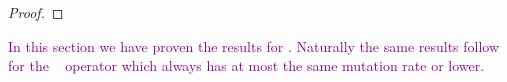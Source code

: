 \documentclass[lettersize,journal]{IEEEtran}
\begin{document}
\begin{proof}
	
\end{proof}

\textcolor{purple}{In this section we have proven the results for \linHD. Naturally the same results follow for the \expoHD~ operator which always has at most the same mutation rate or lower.}

%
%	
%	
\end{document}
